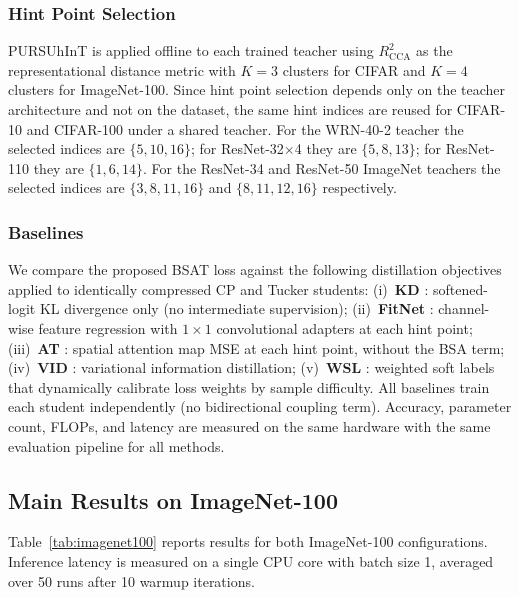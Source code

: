 \documentclass[conference]{IEEEtran}
\begin{document}
\subsubsection{Hint Point Selection}
PURSUhInT is applied offline to each trained teacher using $R^2_{\mathrm{CCA}}$
as the representational distance metric with $K = 3$ clusters for CIFAR and
$K = 4$ clusters for ImageNet-100.
Since hint point selection depends only on the teacher architecture and not
on the dataset, the same hint indices are reused for CIFAR-10 and CIFAR-100
under a shared teacher.
For the WRN-40-2 teacher the selected indices are $\{5, 10, 16\}$;
for ResNet-32$\times$4 they are $\{5, 8, 13\}$;
for ResNet-110 they are $\{1, 6, 14\}$.
For the ResNet-34 and ResNet-50 ImageNet teachers the selected indices
are $\{3, 8, 11, 16\}$ and $\{8, 11, 12, 16\}$ respectively.

\subsubsection{Baselines}
We compare the proposed BSAT loss against the following distillation
objectives applied to identically compressed CP and Tucker students:
(i)~\textbf{KD} \cite{hinton2015distilling}: softened-logit KL divergence
only (no intermediate supervision);
(ii)~\textbf{FitNet} \cite{romero2015fitnetshintsdeepnets}: channel-wise
feature regression with $1{\times}1$ convolutional adapters at each hint
point;
(iii)~\textbf{AT} \cite{zagoruyko2016paying}: spatial attention map MSE at
each hint point, without the BSA term;
(iv)~\textbf{VID} \cite{ahn2019variational}: variational information
distillation;
(v)~\textbf{WSL} \cite{zhou2021rethinking}: weighted soft labels that
dynamically calibrate loss weights by sample difficulty.
All baselines train each student independently (no bidirectional coupling
term). Accuracy, parameter count, FLOPs, and latency are measured on the
same hardware with the same evaluation pipeline for all methods.

\subsection{Main Results on ImageNet-100}
\label{sec:results_imagenet}

Table~\ref{tab:imagenet100} reports results for both ImageNet-100
configurations. Inference latency is measured on a single CPU core with
batch size 1, averaged over 50 runs after 10 warmup iterations.
\end{document}
